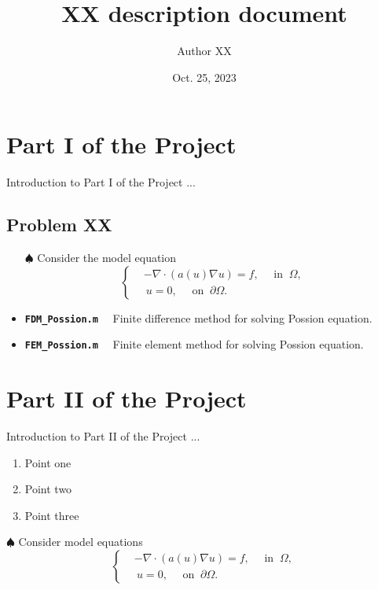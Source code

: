 \documentclass[11pt]{article}
\title{XX description document}
\author{Author XX}
\date{Oct. 25, 2023}
\newcommand{\textcode}[1]{\textcolor{winered}{\bfseries\texttt{#1}}~~}
\begin{document}
\maketitle


\section{Part I of the Project}

Introduction to Part I of the Project ...

\subsection{Problem XX}

\begin{itemize}
\setlength{\itemsep}{3pt}
\item [$\spadesuit$] Consider the model equation
\begin{equation}\label{eq:NLPossion}
\left\{
\begin{aligned}
&-\nabla \cdot(a(u) \nabla u) = f,\quad \text{ in } ~\Omega, \\
&~u = 0, \quad \text{ on } ~ \partial \Omega.
\end{aligned}\right.
\end{equation}

\item \textcode{FDM\_Possion.m} Finite difference method for solving Possion equation.

\item \textcode{FEM\_Possion.m} Finite element method for solving Possion equation.

\end{itemize}


\section{Part II of the Project}

Introduction to Part II of the Project ...

\begin{enumerate}
\setlength{\itemsep}{3pt}
  \item Point one
  \item Point two
  \item Point three
\end{enumerate}



\medskip
\noindent $\spadesuit$ Consider model equations
\begin{equation}\label{eq:NLPossion2}
\left\{
\begin{aligned}
&-\nabla \cdot(a(u) \nabla u) = f,\quad \text{ in } ~\Omega, \\
&~u = 0, \quad \text{ on } ~ \partial \Omega.
\end{aligned}\right.
\end{equation}
\end{document}
